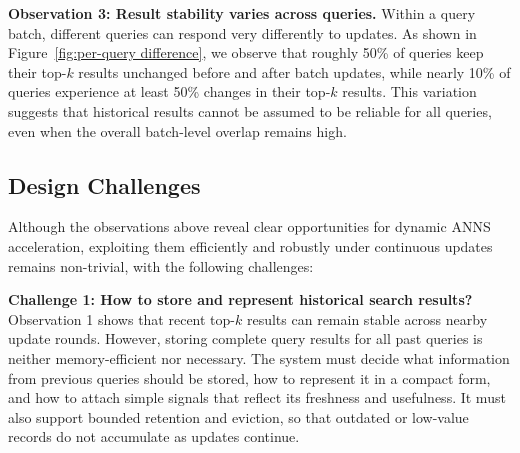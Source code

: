 
\noindent\textbf{Observation 3: Result stability varies across queries.}
Within a query batch, different queries can respond very differently to updates. As shown in Figure~\ref{fig:per-query difference}, we observe that roughly 50\% of queries keep
their top-$k$ results unchanged before and after batch updates, while nearly 10\% of queries experience at least 50\% changes in their top-$k$ results. This variation suggests that historical results cannot be assumed to be reliable for all queries, even when the overall batch-level overlap remains high.


\subsection{Design Challenges}

Although the observations above reveal clear opportunities for dynamic ANNS acceleration, exploiting them efficiently and robustly under continuous updates remains non-trivial,
with the following challenges:

\noindent\textbf{Challenge 1: How to store and represent historical search results?}
Observation 1 shows that recent top-$k$ results can remain stable across nearby update rounds.
However, storing complete query results for all past queries is neither memory-efficient nor necessary.
The system must decide what information from previous queries should be stored, how to represent it in a compact form, and how to attach simple signals that reflect its freshness and usefulness.
It must also support bounded retention and eviction, so that outdated or low-value records do not accumulate as updates continue.










